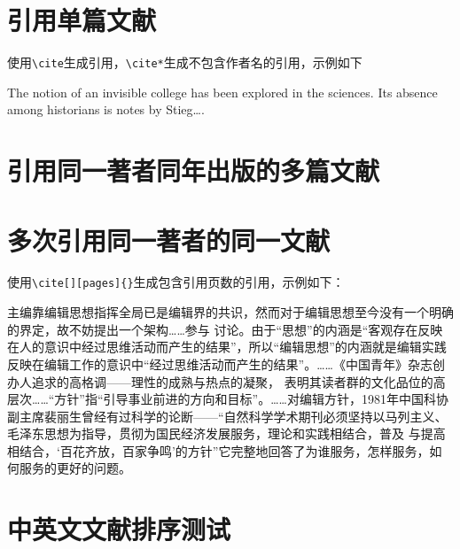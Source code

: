 \documentclass{article}
\begin{document}
\section{引用单篇文献}\newrefsection
使用\verb|\cite|生成引用，\verb|\cite*|生成不包含作者名的引用，示例如下

The notion of an invisible college has been explored in the sciences\cite{ay1}. Its absence among historians is notes by
Stieg\cite*{ay2}\dots.
\printbibliography[heading=bibhead]
\section{引用同一著者同年出版的多篇文献}\newrefsection%
\nocite{ay3}
\nocite{ay4}
\printbibliography[heading=bibhead]%
\section{多次引用同一著者的同一文献}\newrefsection
使用\verb|\cite[][pages]{}|生成包含引用页数的引用，示例如下：

\nocite{ay5}\nocite{ay6}\nocite{ay7}\nocite{ay8}
主编靠编辑思想指挥全局已是编辑界的共识\cite{ay7}，然而对于编辑思想至今没有一个明确的界定，故不妨提出一个架构\dots\dots 参与
讨论。由于“思想”的内涵是“客观存在反映在人的意识中经过思维活动而产生的结果”\cite[][1194]{ay8}，所以“编辑思想”的内涵就是编辑实践
反映在编辑工作的意识中“经过思维活动而产生的结果”。\dots\dots《中国青年》杂志创办人追求的高格调——理性的成熟与热点的凝聚\cite{ay6}，
表明其读者群的文化品位的高层次\dots\dots“方针”指“引导事业前进的方向和目标”\cite[][354]{ay8}。\dots\dots 对编辑方针，1981年中国科协
副主席裴丽生曾经有过科学的论断——“自然科学学术期刊必须坚持以马列主义、毛泽东思想为指导，贯彻为国民经济发展服务，理论和实践相结合，普及
与提高相结合，‘百花齐放，百家争鸣’的方针”\cite{ay5}它完整地回答了为谁服务，怎样服务，如何服务的更好的问题。
\printbibliography[heading=bibhead]
\section{中英文文献排序测试}\newrefsection
\nocite{ay1}\nocite{ay2}\nocite{ay5}\nocite{ay6}\nocite{ay3}\nocite{ay4}\nocite{ay7}\nocite{ay8}
\printbibliography[heading=bibhead]
\end{document}
